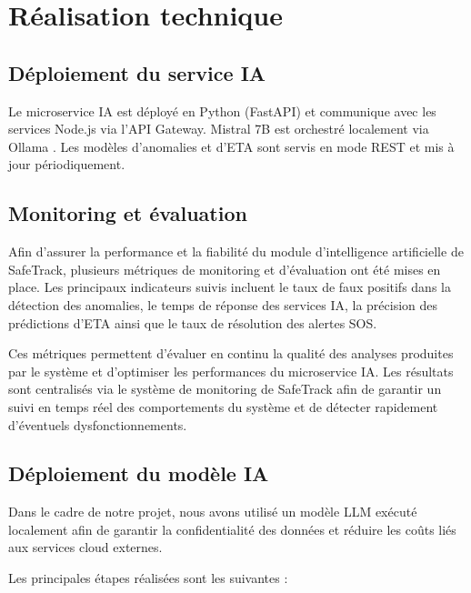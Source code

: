 \section{Réalisation technique}

\subsection{Déploiement du service IA}
Le microservice IA est déployé en Python (FastAPI) et communique avec les services Node.js via l'API Gateway. Mistral 7B \cite{mistral7b} est orchestré localement via Ollama \cite{ollama}. Les modèles d'anomalies et d'ETA sont servis en mode REST et mis à jour périodiquement.

\subsection{Monitoring et évaluation}

Afin d’assurer la performance et la fiabilité du module d’intelligence artificielle de SafeTrack, plusieurs métriques de monitoring et d’évaluation ont été mises en place. Les principaux indicateurs suivis incluent le taux de faux positifs dans la détection des anomalies, le temps de réponse des services IA, la précision des prédictions d’ETA ainsi que le taux de résolution des alertes SOS.

Ces métriques permettent d’évaluer en continu la qualité des analyses produites par le système et d’optimiser les performances du microservice IA. Les résultats sont centralisés via le système de monitoring de SafeTrack afin de garantir un suivi en temps réel des comportements du système et de détecter rapidement d’éventuels dysfonctionnements.

\subsection{Déploiement du modèle IA}

Dans le cadre de notre projet, nous avons utilisé un modèle LLM exécuté localement afin de garantir la confidentialité des données et réduire les coûts liés aux services cloud externes.

Les principales étapes réalisées sont les suivantes :

